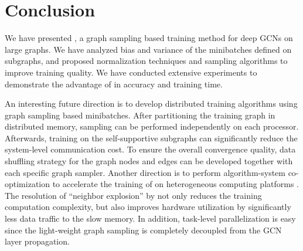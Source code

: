 \section{Conclusion}

We have presented {\graphsaint}, a graph sampling based training method for deep GCNs on large graphs. 
We have analyzed bias and variance of the minibatches defined on subgraphs, and proposed normalization techniques and sampling algorithms to improve training quality. We have conducted extensive experiments to demonstrate the advantage of {\graphsaint} in accuracy and training time. 

An interesting future direction is to develop distributed training algorithms using graph sampling based minibatches. 
After partitioning the training graph in distributed memory, sampling can be performed independently on each processor. 
Afterwards, training on the self-supportive subgraphs can significantly reduce the system-level communication cost. 
To ensure the overall convergence quality, data shuffling strategy for the graph nodes and edges can be developed together with each specific graph sampler. 
Another direction is to perform algorithm-system co-optimization to accelerate the training of {\graphsaint} on heterogeneous computing platforms \citep{ipdps_arxiv,graphact}. 
The resolution of ``neighbor explosion'' by {\graphsaint} not only reduces the training computation complexity, but also improves hardware utilization by significantly less data traffic to the slow memory. In addition, task-level parallelization is easy since the light-weight graph sampling is completely decoupled from the GCN layer propagation. 

